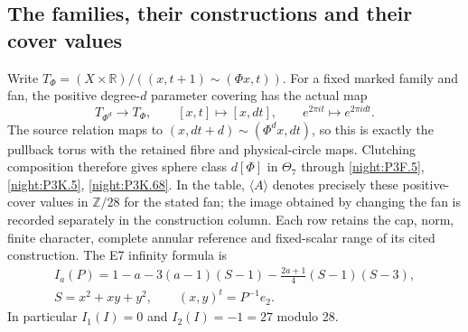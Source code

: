 \subsection{The families, their constructions and their cover values}
Write
\(T_\Phi=(X\times\mathbb R)/((x,t+1)\sim(\Phi x,t))\).
For a fixed marked family and fan, the positive degree-\(d\)
parameter covering has the actual map
\[
 T_{\Phi^d}\longrightarrow T_\Phi,
 \qquad [x,t]\longmapsto[x,dt],
 \qquad e^{2\pi it}\longmapsto e^{2\pi idt}.
\]
The source relation maps to
\((x,dt+d)\sim(\Phi^d x,dt)\), so this is exactly the
pullback torus with the retained fibre and physical-circle maps.
Clutching composition therefore gives sphere class \(d[\Phi]\)
in \(\Theta_7\) through \cref{night:P3F.5}, \cref{night:P3K.5}, \cref{night:P3K.68}.
In the table, \(\langle A\rangle\) denotes precisely these
positive-cover values in \(\mathbb Z/28\) for the stated fan;
the image obtained by changing the fan is recorded separately
in the construction column. Each row retains the cap, norm,
finite character, complete annular reference and fixed-scalar
range of its cited construction. The E7 infinity formula is
\[
 \begin{gathered}
 I_a(P)=1-a-3(a-1)(S-1)
       -\frac{2a+1}{4}(S-1)(S-3),\\
 S=x^2+xy+y^2,\qquad (x,y)^t=P^{-1}e_2.
 \end{gathered}
\]
In particular \(I_1(I)=0\) and \(I_2(I)=-1=27\) modulo 28.

